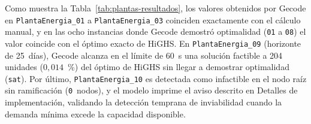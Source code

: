 Como muestra la Tabla~\ref{tab:plantas-resultados}, los valores obtenidos por Gecode en \texttt{PlantaEnergia\_01} a \texttt{PlantaEnergia\_03} coinciden exactamente con el c\'alculo manual, y en las ocho instancias donde Gecode demostr\'o optimalidad (\texttt{01} a \texttt{08}) el valor coincide con el \'optimo exacto de HiGHS. En \texttt{PlantaEnergia\_09} (horizonte de 25~d\'ias), Gecode alcanza en el l\'imite de 60~s una soluci\'on factible a 204 unidades ($0{,}014$~\%) del \'optimo de HiGHS sin llegar a demostrar optimalidad (\texttt{sat}). Por \'ultimo, \texttt{PlantaEnergia\_10} es detectada como infactible en el nodo ra\'iz sin ramificaci\'on (\texttt{0}~nodos), y el modelo imprime el aviso descrito en Detalles de implementaci\'on, validando la detecci\'on temprana de inviabilidad cuando la demanda m\'inima excede la capacidad disponible.